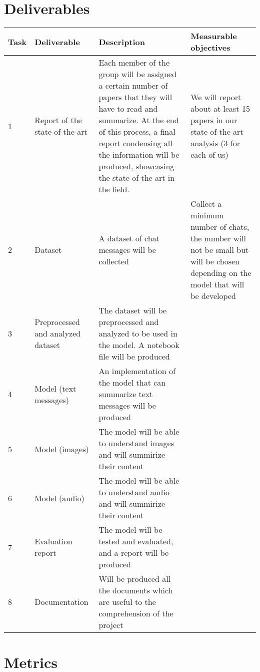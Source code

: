 \documentclass[12pt]{article}
\begin{document}
\section{Deliverables}
\begin{center}
    \begin{tabular}{ |p{1.5cm}|p{3cm}|p{6cm}|p{3cm}|} 
        \hline
        Task & Deliverable & Description & Measurable objectives\\
        \hline
        1 & Report of the state-of-the-art & Each member of the group will be assigned a certain number of papers that they will have to read and summarize. At the end of this process, a final report condensing all the information will be produced, showcasing the state-of-the-art in the field. & We will report about at least 15 papers in our state of the art analysis (3 for each of us) \\
        \hline
        2 & Dataset & A dataset of chat messages will be collected & Collect a minimum number of chats, the number will not be small but will be chosen depending on the model that will be developed \\
        \hline
        3 & Preprocessed and analyzed dataset & The dataset will be preprocessed and analyzed to be used in the model. A notebook file will be produced &\\
        \hline
        4 & Model (text messages) & An implementation of the model that can summarize text messages will be produced &\\
        \hline
        5 & Model (images) & The model will be able to understand images and will summirize their content & \\
        \hline
        6 & Model (audio) & The model will be able to understand audio and will summirize their content &\\
        \hline
        7 & Evaluation report & The model will be tested and evaluated, and a report will be produced &\\
        \hline
        8 & Documentation & Will be produced all the documents which are useful to the comprehension of the project & \\
        \hline
    \end{tabular}
\end{center}
\section{Metrics}
\end{document}
